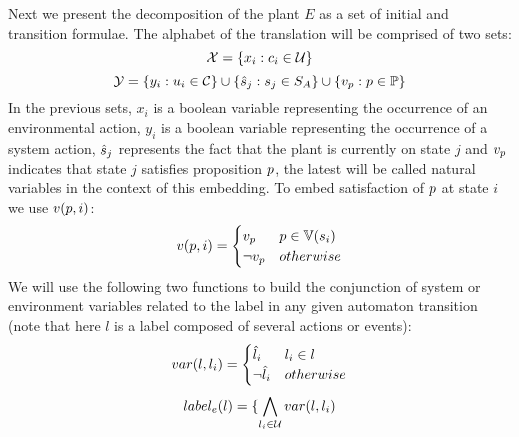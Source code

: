 %
Next we present the decomposition of the plant $E$ as a set of initial and transition formulae.
The alphabet of the translation will be comprised of two sets:
\[{\mathcal{X}} = \{x_i : c_i \in {\mathcal{U}} \}\]
\[{\mathcal{Y}} = \{y_i : u_i \in {\mathcal{C}} \} \cup \{\hat{s}_{j} : s_j \in S_A \} \cup \{v_{{p}} : {p} \in {\mathbb{P}}\}\]
In the previous sets, $x_i$ is a boolean variable representing the occurrence of an environmental action, $y_i$ is a boolean variable representing the occurrence of a system action, $\hat{s}_{j}$ represents the fact that the plant is currently on state $j$ and $v_{{p}}$ indicates that state $j$ satisfies proposition ${p}$, the latest will be called natural variables in the context of this embedding.
To embed satisfaction of ${p}$ at state $i$ we use $v({p},i)$:
\[
v({p},i) = \begin{cases}
v_{{p}} & {p} \in {\mathbb{V}}(s_i) \\
\neg v_{{p}} & otherwise
\end{cases}
\]
We will use the following two functions to build the conjunction of system or environment variables related to the label in any given automaton transition (note that here $l$ is a label composed of several actions or events):
\[
var(l, l_i) = \begin{cases}
\hat{l}_{i} & l_i \in l \\
\neg \hat{l}_{i} & otherwise
\end{cases}
\]
\[label_e(l) = \{\bigwedge_{l_i \in {\mathcal{U}}}var(l, l_i)\]
